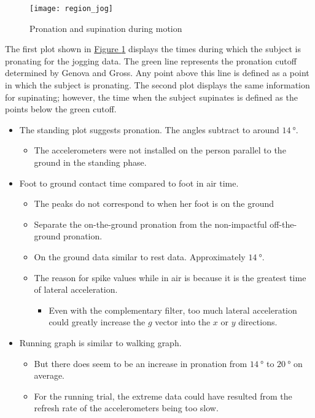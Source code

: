 \begin{figure}[p]
  \centering
  \texttt{[image: region\_jog]}
  \caption[Pronation and supination data]{Pronation and supination during motion}
  \label{fig:x pron. motion}
\end{figure}

The first plot shown in \hyperref[{fig:x pron. motion}]{Figure \ref*{fig:x pron. motion}} displays the times during which the subject is pronating for the jogging data.
The green line represents the pronation cutoff determined by Genova and Gross.
Any point above this line is defined as a point in which the subject is pronating.
The second plot displays the same information for supinating; however, the time when the subject supinates is defined as the points below the green cutoff.

\begin{itemize}
  \item The standing plot suggests pronation. The angles subtract to around $\SI{14}{\degree}$.
    \begin{itemize}
      \item The accelerometers were not installed on the person parallel to the ground in the standing phase.
    \end{itemize}
  \item Foot to ground contact time compared to foot in air time.
    \begin{itemize}
      \item The peaks do not correspond to when her foot is on the ground
      \item Separate the on-the-ground pronation from the non-impactful off-the-ground pronation.
      \item On the ground data similar to rest data. Approximately $\SI{14}{\degree}$.
      \item The reason for spike values while in air is because it is the greatest time of lateral acceleration.
	\begin{itemize}
	  \item Even with the complementary filter, too much lateral acceleration could greatly increase the $g$ vector into the $x$ or $y$ directions.
	\end{itemize}
    \end{itemize}
  \item Running graph is similar to walking graph.
    \begin{itemize}
      \item But there does seem to be an increase in pronation from $\SI{14}{\degree}$ to $\SI{20}{\degree}$ on average.
      \item For the running trial, the extreme data could have resulted from the refresh rate of the accelerometers being too slow.
    \end{itemize}
\end{itemize}

